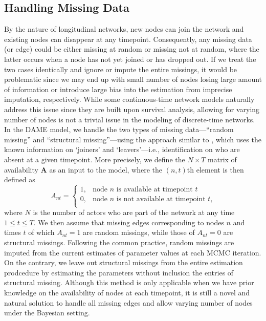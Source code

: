\documentclass[a4paper]{article}
\begin{document}
\subsection{Handling Missing Data}\label{subsec: varying number of nodes}
By the nature of longitudinal networks, new nodes can join the network and existing nodes can disappear at any timepoint. Consequently, any missing data (or edge) could be either missing at random or missing not at random, where the latter occurs when a node has not yet joined or has dropped out. If we treat the two cases identically and ignore or impute the entire missings, it would be problematic since we may end up with small number of nodes losing large amount of information or introduce large bias into the estimation from imprecise imputation, respectively.
 While some continuous-time network models \citep{butts2008relational,vu2011continuous} naturally address this issue since they are built upon survival analysis, allowing for varying number of nodes is not a trivial issue in the modeling of discrete-time networks. \\ \newline 
 In the DAME model, we handle the two types of missing data---``random missing'' and ``structural missing''---using the approach similar to \cite{snijders2010introduction}, which uses the known information on `joiners' and `leavers'---i.e., identification on who are absent at a given timepoint. More precisely, we define the $N\times T$ matrix of availability $\mathbf{A}$ as an input to the model, where the $(n, t)${th} element is then defined as
\begin{equation*}
A_{nt} =\begin{cases}
1, & \mbox{node $n$ is available at timepoint $t$}\\
0, & \mbox{node $n$ is not available at timepoint $t$,}\\
\end{cases}
\end{equation*}
where $N$ is the number of actors who are part of the network at any time $1\leq t \leq T$. We then assume that missing edges corresponding to nodes $n$ and times $t$ of which $A_{nt} = 1$ are random missings, while those of $A_{nt} = 0$ are structural missings. Following the common practice, random missings are imputed from the current estimates of parameter values at each MCMC iteration.  On the contrary, we leave out structural missings from the entire estimation prodcedure by estimating the parameters without inclusion the entries of structural missing. Although this method is only applicable when we have prior knowledge on the availability of nodes at each timepoint, it is still a novel and natural solution to handle all missing edges and allow varying number of nodes under the Bayesian setting.
\end{document}
